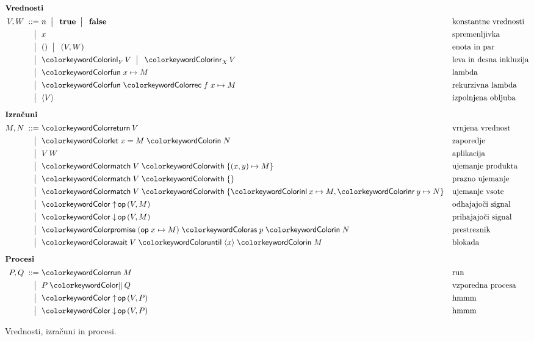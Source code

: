 \documentclass[12pt,a4paper,twoside]{article}
\theoremstyle{definition} %
\theoremstyle{plain} %
\numberwithin{equation}{section}  %
\begin{document}
\begin{figure}[hp]
	\parbox{\textwidth}{
		\centering
		\small
		\begin{align*}
		\intertext{\textbf{Vrednosti}}
		V, W
		\bnfis& n \bnfor\! \true \bnfor\! \false        & &\text{konstantne vrednosti} \\
		\bnfor& x                                       & &\text{spremenljivka} \\
		\bnfor& \tmunit \bnfor\! \tmpair{V}{W}          & &\text{enota in par} \\
		\bnfor& \tminl[Y]{V} \bnfor\! \tminr[X]{V}      & &\text{leva in desna inkluzija} \\
		\bnfor& \tmfun{x}{M}                        & &\text{lambda} \\
		\bnfor& \tmfunrec{f}{x}{M}                        & &\text{rekurzivna lambda} \\
		\bnfor& \tmpromise V                            & &\text{izpolnjena obljuba}
		\\[1ex]
		\intertext{\textbf{Izračuni}}
		M, N
		\bnfis& \tmreturn{V}                            & &\text{vrnjena vrednost} \\
		\bnfor& \tmlet{x}{M}{N}                         & &\text{zaporedje} \\
		\bnfor& V\,W                                    & &\text{aplikacija} \\
		\bnfor& \tmmatch{V}{\tmpair{x}{y} \mapsto M}    & &\text{ujemanje produkta} \\
		\bnfor& \tmmatch[]{V}{}                        & &\text{prazno ujemanje} \\
		\bnfor& \tmmatch{V}{\tminl{x} \mapsto M, \tminr{y} \mapsto N}	& &\text{ujemanje vsote} \\
		\bnfor& \tmopout{op}{V}{M}       & &\text{odhajajoči signal} \\
		\bnfor& \tmopin{op}{V}{M}          & &\text{prihajajoči signal } \\
		\bnfor& \tmwith{op}{x}{M}{p}{N}      & &\text{prestreznik} \\
		\bnfor& \tmawait{V}{x}{M}             & &\text{blokada}
			\\[1ex]
		\intertext{\textbf{Procesi}}
		  P, Q
		\bnfis & \tmrun M & & \text{run} \\
		\bnfor & \tmpar P Q & & \text{vzporedna procesa} \\
		\bnfor & \tmopout{op}{V}{P} & & \text{hmmm} \\
		\bnfor & \tmopin{op}{V}{P} & & \text{hmmm}
		\end{align*}
	} 
	\caption{Vrednosti, izračuni in procesi.}
	\label{fig:izrazi}
\end{figure}
\end{document}
